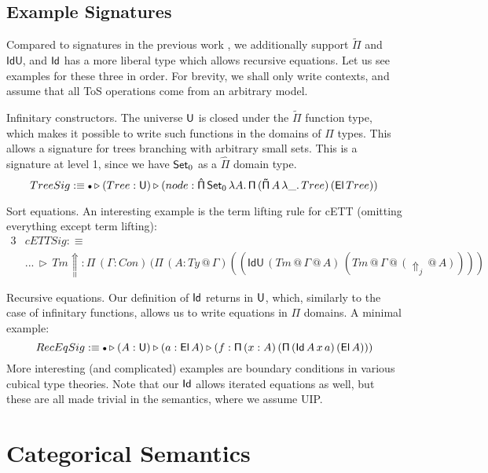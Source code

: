 \documentclass{llncs}
\makeatletter
\newcommand{\Lift}{\Uparrow}
\newcommand{\ext}{\triangleright}
\newcommand{\emptycon}{\scaleobj{.75}\bullet}
\newcommand{\Pii}{\mathsf{\Pi}}
\newcommand{\Pie}{\mathsf{\hat{\Pi}}}
\newcommand{\Piinf}{\mathsf{\tilde{\Pi}}}
\newcommand{\appitt}{\mathop{{\scriptstyle @}}}
\newcommand{\IdU}{\mathsf{IdU}}
\makeatother
\begin{document}
\subsection{Example Signatures}

Compared to signatures in the previous work \cite{TODO}, we additionally support
$\Piinf$ and $\IdU$, and $\mathsf{Id}$ has a more liberal type which allows recursive
equations. Let us see examples for these three in order. For brevity, we shall
only write contexts, and assume that all ToS operations come from an arbitrary
model.

\begin{example}{Infinitary constructors}. The universe $\mathsf{U}$ is closed under
the $\Piinf$ function type, which makes it possible to write such functions in
the domains of $\Pii$ types. This allows a signature for trees branching with
arbitrary small sets. This is a signature at level 1, since we have $\mathsf{Set}_0$ as
a $\Pie$ domain type.
\[
TreeSig :\equiv
\emptycon \ext (Tree : \U) \ext (node : \Pie\,\Set_0\,\lambda A.\,\Pii\,(\Piinf\,A\,\lambda \_.\,Tree)\,(\El\,Tree))
\]
\end{example}

\begin{example}{Sort equations}. An interesting example is the term lifting
rule for cETT (omitting everything except term lifting):
\begin{alignat*}{3}
  & cETTSig :\equiv \\
  & ...\,\ext\,Tm{\Lift} : \Pii\,(\Gamma : Con)\,(\Pii\,(A : Ty{\appitt}\Gamma)((\IdU\,(Tm{\appitt}\Gamma{\appitt}A)\,(Tm{\appitt}\Gamma{\appitt}(\Lift_j{\appitt}A))))
\end{alignat*}
\end{example}

\begin{example}{Recursive equations}. Our definition of $\mathsf{Id}$ returns in $\mathsf{U}$,
which, similarly to the case of infinitary functions, allows us to write equations
in $\Pii$ domains. A minimal example:
\[
RecEqSig :\equiv \emptycon \ext (A : \U) \ext (a : \El\,A) \ext (f : \Pii\,(x : A)\,(\Pii\,(\Id\,A\,x\,a)\,(\El\,A)))
\]
More interesting (and complicated) examples are boundary conditions in various
cubical type theories\cite{TODO}. Note that our $\mathsf{Id}$ allows iterated equations
as well, but these are all made trivial in the semantics, where we assume UIP.
\end{example}

\section{Categorical Semantics}
\label{sec:categorical_semantics}
\end{document}
